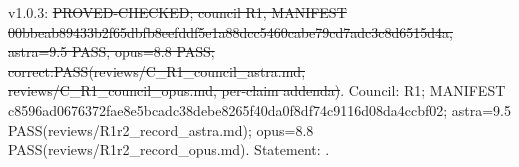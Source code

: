 \begin{theorem}\label{reg:W3-RM2_RM2-F}
\end{theorem}
\begin{statusbox}
 v1.0.3: \st{PROVED-CHECKED; council R1, MANIFEST 00bbeab89433b2f65dbfb8eefddf5e1a88dcc5460cabe79cd7adc3c8d6515d4a, astra=9.5 PASS, opus=8.8 PASS; correct:PASS(reviews/C\_R1\_council\_astra.md, reviews/C\_R1\_council\_opus.md, per-claim addenda)}. Council: R1; MANIFEST c8596ad0676372fae8e5bcadc38debe8265f40da0f8df74c9116d08da4ccbf02; astra=9.5 PASS(reviews/R1r2\_record\_astra.md); opus=8.8 PASS(reviews/R1r2\_record\_opus.md). Statement: .
\end{statusbox}
